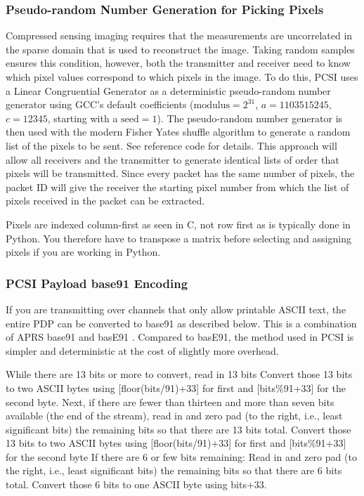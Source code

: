 \documentclass[letterpaper]{article}
\begin{document}
\subsubsection{Pseudo-random Number Generation for Picking Pixels}\label{section:PRNG}
Compressed sensing imaging requires that the measurements are uncorrelated in the sparse domain that is used to reconstruct the image. Taking random samples ensures this condition, however, both the transmitter and receiver need to know which pixel values correspond to which pixels in the image.
To do this, PCSI uses a Linear Congruential Generator \cite{lcg} as a deterministic pseudo-random number generator using GCC's default coefficients ($\text{modulus}=2^{31}$, $a=1103515245$, $c=12345$, starting with a $\text{seed}=1$).
The pseudo-random number generator is then used with the modern Fisher Yates shuffle algorithm \cite{fyshuffle} to generate a random list of the pixels to be sent.
See reference code for details. This approach will allow all receivers and the transmitter to generate identical lists of order that pixels will be transmitted. Since every packet has the same number of pixels, the packet ID will give the receiver the starting pixel number from which the list of pixels received in the packet can be extracted.

Pixels are indexed column-first as seen in C, not row first as is typically done in Python. You therefore have to transpose a matrix before selecting and assigning pixels if you are working in Python.

\subsubsection{PCSI Payload base91 Encoding}
If you are transmitting over channels that only allow printable ASCII text, the entire PDP can be converted to base91 as described below. This is a combination of APRS base91 and basE91 \cite{base91}. Compared to basE91, the method used in PCSI is simpler and deterministic at the cost of slightly more overhead.

While there are 13 bits or more to convert, read in 13 bits
Convert those 13 bits to two ASCII bytes using [floor(bits/91)+33] for first and [bits\%91+33] for the second byte.
Next, if there are fewer than thirteen and more than seven bits available (the end of the stream), read in and zero pad (to the right, i.e., least significant bits) the remaining bits so that there are 13 bits total.
Convert those 13 bits to two ASCII bytes using [floor(bits/91)+33] for first and [bits\%91+33] for the second byte
If there are 6 or few bits remaining:
Read in and zero pad (to the right, i.e., least significant bits) the remaining bits so that there are 6 bits total.
Convert those 6 bits to one ASCII byte using bits+33.
\end{document}
